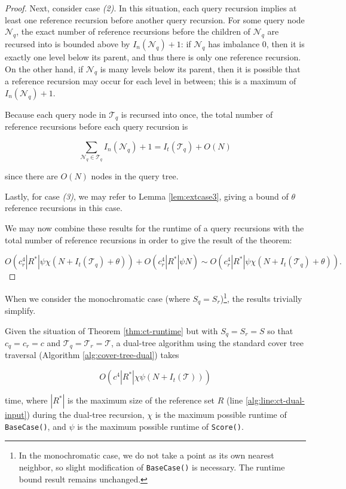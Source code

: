 \begin{proof}
Next, consider case \textit{(2)}.  In this situation, each query recursion
implies at least one reference recursion before another query recursion.  For
some query node $\mathscr{N}_q$, the exact number of reference recursions before
the children of $\mathscr{N}_q$ are recursed into is bounded above by
$I_n(\mathscr{N}_q) + 1$: if $\mathscr{N}_q$ has imbalance $0$, then it is
exactly one level below its parent, and thus there is only one reference
recursion.  On the other hand, if $\mathscr{N}_q$ is many levels below its
parent, then it is possible that a reference recursion may occur for each level
in between; this is a maximum of $I_n(\mathscr{N}_q) + 1$.

Because each query node in $\mathscr{T}_q$ is recursed into once, the total
number of reference recursions before each query recursion is

\begin{equation}
\sum_{\mathscr{N}_q \in \mathscr{T}_q} I_n(\mathscr{N}_q) + 1 = I_t(\mathscr{T}_q) +
O(N)
\end{equation}

\noindent since there are $O(N)$ nodes in the query tree.

Lastly, for case \textit{(3)}, we may refer to Lemma \ref{lem:extcase3}, giving
a bound of $\theta$ reference recursions in this case.

We may now combine these results for the runtime of a query recursions with the
total number of reference recursions in order to give the result of the theorem:

\begin{equation}
O\left(c_r^4 |R^*| \psi \chi \left(N + I_t(\mathscr{T}_q) + \theta\right)\right)
+ O\left(c_r^4 |R^*| \psi N\right) \sim O\left(c_r^4 |R^*| \psi
\chi \left(N + I_t(\mathscr{T}_q) + \theta\right)\right).
\end{equation}
\end{proof}

When we consider the monochromatic case (where $S_q = S_r$)\footnote{In the
monochromatic case, we do not take a point as its own nearest neighbor, so
slight modification of {\tt BaseCase()} is necessary.  The runtime bound result
remains unchanged.}, the results trivially simplify.

\begin{cor}
\label{cor:ct-runtime-mono}
Given the situation of Theorem \ref{thm:ct-runtime} but with $S_q = S_r = S$ so
that $c_q = c_r = c$ and $\mathscr{T}_q = \mathscr{T}_r = \mathscr{T}$, a
dual-tree algorithm using the standard cover tree traversal (Algorithm
\ref{alg:cover-tree-dual}) takes

\begin{equation}
O\left(c^4 |R^*| \chi \psi \left(N + I_t(\mathscr{T})\right)\right)
\end{equation}

\noindent time, where $ | R^* | $ is the maximum size of the reference set $R$
(line \ref{alg:line:ct-dual-input}) during the dual-tree recursion, $\chi$ is
the maximum possible runtime of \texttt{BaseCase()}, and $\psi$ is the maximum
possible runtime of \texttt{Score()}.
\end{cor}

